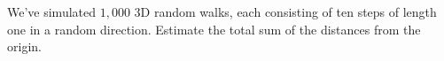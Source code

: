 We've simulated $1,000$ 3D random walks, each consisting of ten steps of length one in a random direction. Estimate the total sum of the distances from the origin.
